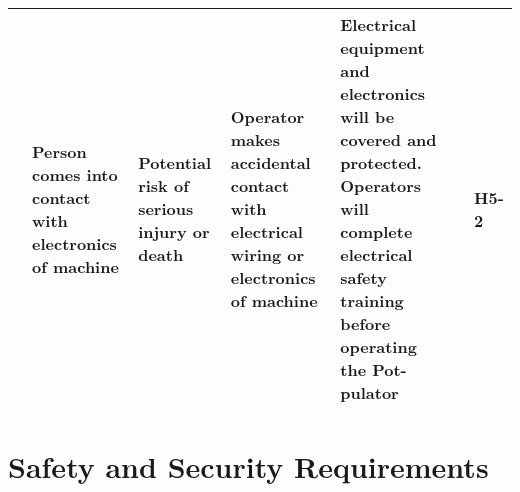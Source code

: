 \documentclass{article}
\begin{document}
\begin{landscape}
\begin{center}
\begin{longtable}{|l|  p{3cm}  p{4cm}  p{4cm}  p{4cm}  p{1cm}  p{1cm}|}
        &
        Person comes into contact with electronics of machine&
        Potential risk of serious injury or death&
        Operator makes accidental contact with electrical wiring or electronics of machine&
        Electrical equipment and electronics will be covered and protected. Operators will complete electrical safety training before operating the Pot-pulator&
        &
        H5-2\\


    \cline{2-7}
    \hline

    \end{longtable}
\end{center}
\end{landscape}


\newpage

\section{Safety and Security Requirements}
\end{document}
